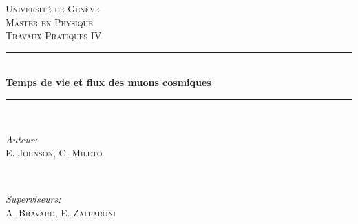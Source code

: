\documentclass[12pt]{article}
\begin{document}

\begin{titlepage}

\newcommand{\HRule}{\rule{\linewidth}{0.5mm}} %

\center %
 

\textsc{\LARGE Université de Genève}\\[1.5cm] %
\textsc{\Large Master en Physique}\\[0.5cm] %
\textsc{\large Travaux Pratiques IV}\\[0.5cm] %


\HRule \\[0.4cm]
{ \huge \bfseries Temps de vie et flux des muons cosmiques}\\[0.4cm] %
\HRule \\[1.5cm]
 

\begin{minipage}{0.4\textwidth}
\begin{flushleft} \large
\emph{Auteur:}\\
E. \textsc{Johnson}, C. \textsc{Mileto} %
\end{flushleft}
\end{minipage}
~
\begin{minipage}{0.4\textwidth}
\begin{flushright} \large
\emph{Superviseurs:} \\
A. \textsc{Bravard}, E. \textsc{Zaffaroni}
\end{flushright}
\end{minipage}\\[2cm]


\end{titlepage}
\end{document}
